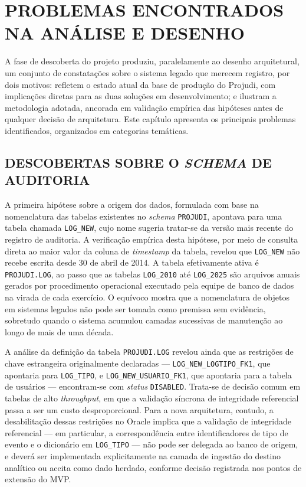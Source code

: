 \documentclass[12pt,letterpaper,oneside]{report}
\begin{document}
\chapter{PROBLEMAS ENCONTRADOS NA ANÁLISE E DESENHO}

A fase de descoberta do projeto produziu, paralelamente ao desenho arquitetural, um conjunto de constatações sobre o sistema legado que merecem registro, por dois motivos: refletem o estado atual da base de produção do Projudi, com implicações diretas para as duas soluções em desenvolvimento; e ilustram a metodologia adotada, ancorada em validação empírica das hipóteses antes de qualquer decisão de arquitetura. Este capítulo apresenta os principais problemas identificados, organizados em categorias temáticas.

\section{DESCOBERTAS SOBRE O \textit{SCHEMA} DE AUDITORIA}

A primeira hipótese sobre a origem dos dados, formulada com base na nomenclatura das tabelas existentes no \textit{schema} \texttt{PROJUDI}, apontava para uma tabela chamada \texttt{LOG\_NEW}, cujo nome sugeria tratar-se da versão mais recente do registro de auditoria. A verificação empírica desta hipótese, por meio de consulta direta ao maior valor da coluna de \textit{timestamp} da tabela, revelou que \texttt{LOG\_NEW} não recebe escrita desde 30 de abril de 2014. A tabela efetivamente ativa é \texttt{PROJUDI.LOG}, ao passo que as tabelas \texttt{LOG\_2010} até \texttt{LOG\_2025} são arquivos anuais gerados por procedimento operacional executado pela equipe de banco de dados na virada de cada exercício. O equívoco mostra que a nomenclatura de objetos em sistemas legados não pode ser tomada como premissa sem evidência, sobretudo quando o sistema acumulou camadas sucessivas de manutenção ao longo de mais de uma década.

A análise da definição da tabela \texttt{PROJUDI.LOG} revelou ainda que as restrições de chave estrangeira originalmente declaradas — \texttt{LOG\_NEW\_LOGTIPO\_FK1}, que apontaria para \texttt{LOG\_TIPO}, e \texttt{LOG\_NEW\_USUARIO\_FK1}, que apontaria para a tabela de usuários — encontram-se com \textit{status} \texttt{DISABLED}. Trata-se de decisão comum em tabelas de alto \textit{throughput}, em que a validação síncrona de integridade referencial passa a ser um custo desproporcional. Para a nova arquitetura, contudo, a desabilitação dessas restrições no Oracle implica que a validação de integridade referencial — em particular, a correspondência entre identificadores de tipo de evento e o dicionário em \texttt{LOG\_TIPO} — não pode ser delegada ao banco de origem, e deverá ser implementada explicitamente na camada de ingestão do destino analítico ou aceita como dado herdado, conforme decisão registrada nos pontos de extensão do MVP.
\end{document}
